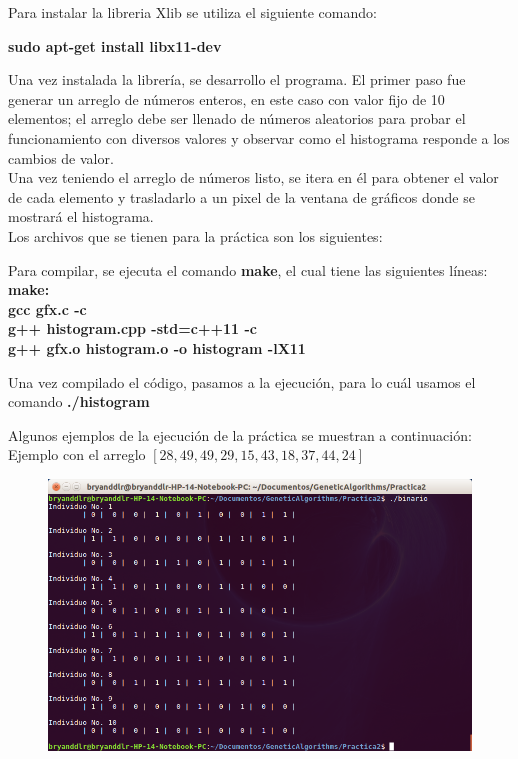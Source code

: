 \documentclass[11pt,letterpaper]{article}
\begin{document}
Para instalar la libreria Xlib se utiliza el siguiente comando:\\
\begin{center}
	\textbf{sudo apt-get install libx11-dev}
\end{center}

Una vez instalada la librería, se desarrollo el programa. El primer paso fue generar un arreglo de números enteros, en este caso con valor fijo de 10 elementos; el arreglo debe ser llenado de números aleatorios para probar el funcionamiento con diversos valores y observar como el histograma responde a los cambios de valor.\\

Una vez teniendo el arreglo de números listo, se itera en él para obtener el valor de cada elemento y trasladarlo a un pixel de la ventana de gráficos donde se mostrará el histograma. \\

Los archivos que se tienen para la práctica son los siguientes:

Para compilar, se ejecuta el comando \textbf{make}, el cual tiene las siguientes líneas:\\
\textbf{make:\\
	gcc gfx.c -c\\
	g++ histogram.cpp -std=c++11 -c\\
	g++ gfx.o histogram.o -o histogram -lX11\\
}
	
Una vez compilado el código, pasamos a la ejecución, para lo cuál usamos el comando  \textbf{./histogram}

Algunos ejemplos de la ejecución de la práctica se muestran a continuación:\\

Ejemplo con el arreglo $\left[28,49,49,29,15,43,18,37,44,24  \right]$

\begin{figure}[H]
	\centering
	\includegraphics[scale = 0.3]{images/ej1}
\end{figure}
\end{document}
